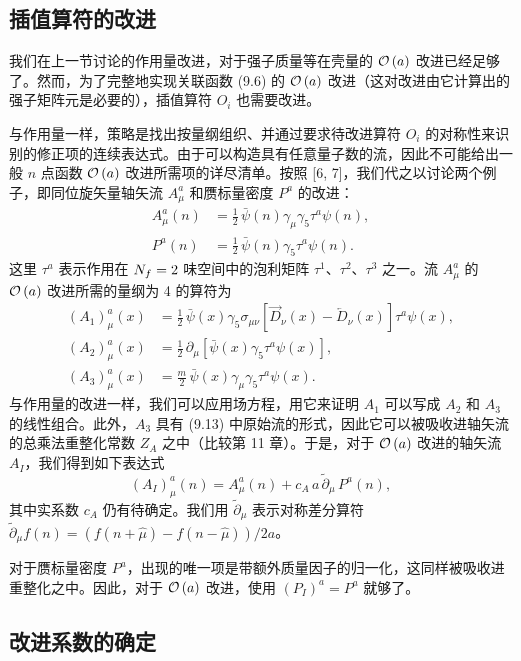 \subsection{插值算符的改进}
\label{sec:9.1.3}

我们在上一节讨论的作用量改进，对于强子质量等在壳量的 $\mathcal{O}\left(a\right)$ 改进已经足够了。然而，为了完整地实现关联函数 (9.6) 的 $\mathcal{O}\left(a\right)$ 改进（这对改进由它计算出的强子矩阵元是必要的），插值算符 $O_i$ 也需要改进。

与作用量一样，策略是找出按量纲组织、并通过要求待改进算符 $O_i$ 的对称性来识别的修正项的连续表达式。由于可以构造具有任意量子数的流，因此不可能给出一般 $n$ 点函数 $\mathcal{O}\left(a\right)$ 改进所需项的详尽清单。按照 [6, 7]，我们代之以讨论两个例子，即同位旋矢量轴矢流 $A_\mu^a$ 和赝标量密度 $P^a$ 的改进：
\begin{align}
  A^a_\mu(n) &= \frac{1}{2}\,\bar\psi(n)\gamma_\mu\gamma_5\tau^a\psi(n) , \nonumber\\
  P^a(n) &= \frac{1}{2}\,\bar\psi(n)\gamma_5\tau^a\psi(n) .
\end{align}
这里 $\tau^a$ 表示作用在 $N_f = 2$ 味空间中的泡利矩阵 $\tau^1$、$\tau^2$、$\tau^3$ 之一。流 $A^a_\mu$ 的 $\mathcal{O}\left(a\right)$ 改进所需的量纲为 4 的算符为
\begin{align}
  (A_1)^a_\mu(x) &= \frac{1}{2}\,\bar\psi(x)\gamma_5\sigma_{\mu\nu}
    \left[\overrightarrow{D}_\nu(x) - \overleftarrow{D}_\nu(x)\right]
    \tau^a\psi(x) , \nonumber\\
  (A_2)^a_\mu(x) &= \frac{1}{2}\,\partial_\mu\left[\bar\psi(x)\gamma_5\tau^a\psi(x)\right] , \nonumber\\
  (A_3)^a_\mu(x) &= \frac{m}{2}\,\bar\psi(x)\gamma_\mu\gamma_5\tau^a\psi(x) .
\end{align}
与作用量的改进一样，我们可以应用场方程，用它来证明 $A_1$ 可以写成 $A_2$ 和 $A_3$ 的线性组合。此外，$A_3$ 具有 (9.13) 中原始流的形式，因此它可以被吸收进轴矢流的总乘法重整化常数 $Z_A$ 之中（比较第 11 章）。于是，对于 $\mathcal{O}\left(a\right)$ 改进的轴矢流 $A_I$，我们得到如下表达式
\begin{equation}
  (A_I)^a_\mu(n) = A^a_\mu(n) + c_A\,a\,\widetilde{\partial}_\mu\,P^a(n) ,
\end{equation}
其中实系数 $c_A$ 仍有待确定。我们用 $\widetilde{\partial}_\mu$ 表示对称差分算符 $\widetilde{\partial}_\mu f(n) = (f(n + \hat\mu) - f(n - \hat\mu))/2a$。

对于赝标量密度 $P^a$，出现的唯一项是带额外质量因子的归一化，这同样被吸收进重整化之中。因此，对于 $\mathcal{O}\left(a\right)$ 改进，使用 $(P_I)^a = P^a$ 就够了。

\subsection{改进系数的确定}
\label{sec:9.1.4}

